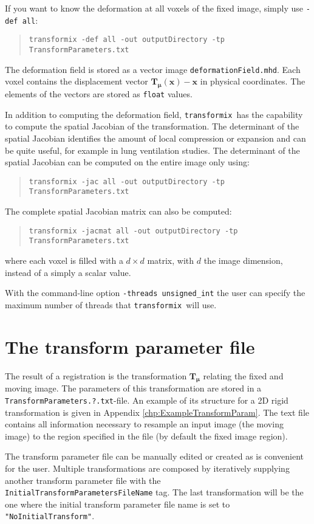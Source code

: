 \documentclass[]{report}
\newcommand{\transformix}{\texttt{transformix}}
\newcommand{\vx}{\bm{x}}
\newcommand{\vmu}{\bm{\mu}}
\newcommand{\vTm}{\bm{T}_{\vmu}}
\newcommand{\vTmx}{\bm{T}_{\vmu}(\bm{x})}
\begin{document}
If you want to know the deformation at all voxels of the fixed
image, simply use \texttt{-def all}:
\begin{quote}
\texttt{transformix -def all -out outputDirectory -tp
TransformParameters.txt}
\end{quote}
The deformation field is stored as a vector image
\texttt{deformationField.mhd}. Each voxel contains the
displacement vector $\vTmx-\vx$ in physical coordinates. The
elements of the vectors are stored as \texttt{float} values.

In addition to computing the deformation field, \transformix\ has
the capability to compute the spatial Jacobian of the
transformation. The determinant of the spatial Jacobian identifies
the amount of local compression or expansion and can be quite
useful, for example in lung ventilation studies. The determinant of
the spatial Jacobian can be computed on the entire image only using:
\begin{quote}
\texttt{transformix -jac all -out outputDirectory -tp
TransformParameters.txt}
\end{quote}
The complete spatial Jacobian matrix can also be computed:
\begin{quote}
\texttt{transformix -jacmat all -out outputDirectory -tp
TransformParameters.txt}
\end{quote}
where each voxel is filled with a $d \times d$ matrix, with $d$ the
image dimension, instead of a simply a scalar value.

With the command-line option \texttt{-threads unsigned\_int} the
user can specify the maximum number of threads that \transformix\
will use.

\section{The transform parameter file}\label{sec:transformix:tp}

The result of a registration is the transformation $\vTm$ relating
the fixed and moving image. The parameters of this transformation
are stored in a \texttt{TransformParameters.?.txt}-file. An
example of its structure for a 2D rigid transformation is given in
Appendix \ref{chp:ExampleTransformParam}. The text file contains
all information necessary to resample an input image (the moving
image) to the region specified in the file (by default the fixed
image region).

The transform parameter file can be manually edited or created as
is convenient for the user. Multiple transformations are composed
by iteratively supplying another transform parameter file with the
\texttt{InitialTransformParametersFileName} tag. The last
transformation will be the one where the initial transform
parameter file name is set to \texttt{"NoInitialTransform"}.
\end{document}
